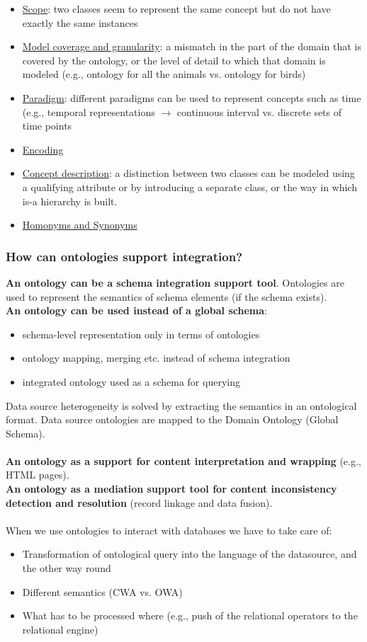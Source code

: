 \documentclass[10pt,a4paper]{article}
\newcommand{\nline}{\\~\\}
\begin{document}
\begin{itemize}
	\item \uline{Scope}: two classes seem to represent the same concept but do not have exactly the same instances
	\item \uline{Model coverage and granularity}: a mismatch in the part of the domain that is covered by the ontology, or the level of detail to which that domain is modeled (e.g., ontology for all the animals vs. ontology for birds)
	\item \uline{Paradigm}: different paradigms can be used to represent concepts such as time (e.g., temporal representations $\rightarrow$ continuous interval vs. discrete sets of time points
	\item \uline{Encoding}
	\item \uline{Concept description}: a distinction between two classes can be modeled using a qualifying attribute or by introducing a separate class, or the way in which is-a hierarchy is built.
	\item \uline{Homonyms and Synonyms}
\end{itemize}
\pagebreak
\subsubsection{How can ontologies support integration?}
\textbf{An ontology can be a schema integration support tool}. Ontologies are used to represent the semantics of schema elements (if the schema exists). \\
\textbf{An ontology can be used instead of a global schema}:
\begin{itemize}
	\item schema-level representation only in terms of ontologies
	\item ontology mapping, merging etc. instead of schema integration
	\item integrated ontology used as a schema for querying
\end{itemize}
Data source heterogeneity is solved by extracting the semantics in an ontological format. Data source ontologies are mapped to the Domain Ontology (Global Schema). \nline
\textbf{An ontology as a support for content interpretation and wrapping} (e.g., HTML pages). \\ \textbf{An ontology as a mediation support tool for content inconsistency detection and resolution} (record linkage and data fusion).
\nline
When we use ontologies to interact with databases we have to take care of:
\begin{itemize}
	\item Transformation of ontological query into the language of the datasource, and the other way round
	\item Different semantics (CWA vs. OWA)
	\item What has to be processed where (e.g., push of the relational operators to the relational engine)
\end{itemize}
\pagebreak
\end{document}
